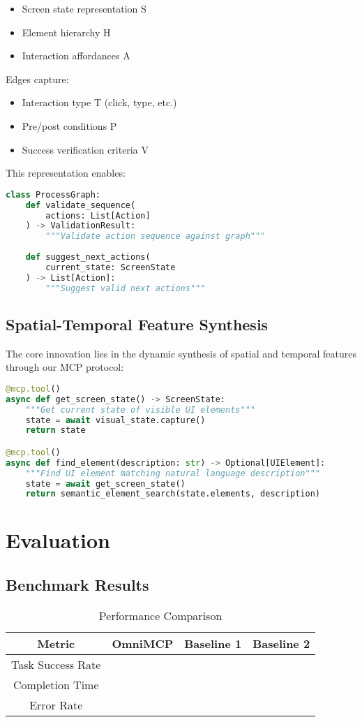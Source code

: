 \documentclass{article}
\begin{document}
\begin{itemize}
    \item Screen state representation S
    \item Element hierarchy H
    \item Interaction affordances A
\end{itemize}

Edges capture:
\begin{itemize}
    \item Interaction type T (click, type, etc.)
    \item Pre/post conditions P
    \item Success verification criteria V
\end{itemize}

This representation enables:
\begin{lstlisting}[language=Python]
class ProcessGraph:
    def validate_sequence(
        actions: List[Action]
    ) -> ValidationResult:
        """Validate action sequence against graph"""
    
    def suggest_next_actions(
        current_state: ScreenState
    ) -> List[Action]:
        """Suggest valid next actions"""
\end{lstlisting}

\subsection{Spatial-Temporal Feature Synthesis}
The core innovation lies in the dynamic synthesis of spatial and temporal features through our MCP protocol:

\begin{lstlisting}[language=Python]
@mcp.tool()
async def get_screen_state() -> ScreenState:
    """Get current state of visible UI elements"""
    state = await visual_state.capture()
    return state

@mcp.tool()
async def find_element(description: str) -> Optional[UIElement]:
    """Find UI element matching natural language description"""
    state = await get_screen_state()
    return semantic_element_search(state.elements, description)
\end{lstlisting}

\section{Evaluation}
\subsection{Benchmark Results}
\begin{table}[h]
\caption{Performance Comparison}
\begin{tabular}{|c|c|c|c|}
\hline
Metric & OmniMCP & Baseline 1 & Baseline 2 \\
\hline
Task Success Rate & & & \\
Completion Time & & & \\
Error Rate & & & \\
\hline
\end{tabular}
\end{table}
\end{document}
